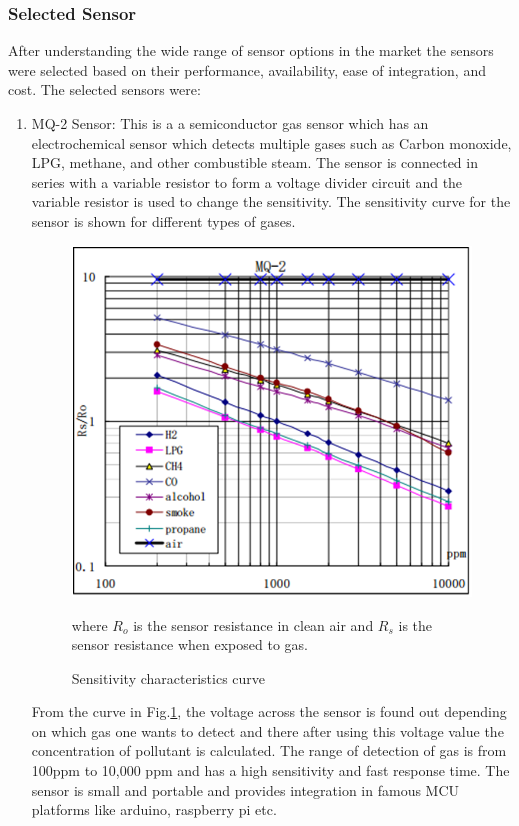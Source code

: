  \subsubsection{Selected Sensor}

 After understanding the wide range of sensor options in the market the sensors were selected based on their performance, availability, ease of integration, and cost. The selected sensors were:
 \begin{enumerate}

  \item MQ-2 Sensor: This is a a semiconductor gas sensor which has an electrochemical sensor which detects multiple gases such as Carbon monoxide, LPG, methane, and other combustible steam. The sensor is connected in series with a variable resistor to form a voltage divider circuit and the variable resistor is used to change the sensitivity. The sensitivity curve for the sensor is shown for different types of gases.
\par
\begin{figure}[h]
  \begin{center}
  \includegraphics[scale=0.40]{./images/figure1.png}
  \end{center}
 
  \caption{Sensitivity characteristics curve \cite{Data2012}}
  
  \label{curve}
where $R_{o}$ is the sensor resistance in clean air and $R_{s}$ is the sensor resistance when exposed to gas.
\end{figure}
From the curve in Fig.\ref{curve}, the voltage across the sensor is found out depending on which gas one wants to detect and there after using this voltage value the concentration of pollutant is calculated. The range of detection of gas is from 100ppm to 10,000 ppm and has a high sensitivity and fast response time. The sensor is small and portable and provides integration in famous MCU platforms like arduino, raspberry pi etc. 


\end{enumerate}
